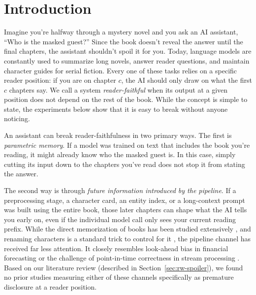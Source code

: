 \documentclass[sn-mathphys]{sn-jnl}%
\theoremstyle{thmstyleone}%
\theoremstyle{thmstyletwo}%
\theoremstyle{thmstylethree}%
\begin{document}
\maketitle

\section{Introduction}\label{sec:intro}

Imagine you're halfway through a mystery novel and you ask an AI assistant, ``Who is the masked guest?'' Since the book doesn't reveal the answer until the final chapters, the assistant shouldn't spoil it for you. Today, language models are constantly used to summarize long novels, answer reader questions, and maintain character guides for serial fiction. Every one of these tasks relies on a specific reader position: if you are on chapter $c$, the AI should only draw on what the first $c$ chapters say. We call a system \emph{reader-faithful} when its output at a given position does not depend on the rest of the book. While the concept is simple to state, the experiments below show that it is easy to break without anyone noticing.

An assistant can break reader-faithfulness in two primary ways. The first is \emph{parametric memory}. If a model was trained on text that includes the book you're reading, it might already know who the masked guest is. In this case, simply cutting its input down to the chapters you've read does not stop it from stating the answer.

The second way is through \emph{future information introduced by the pipeline}. If a preprocessing stage, a character card, an entity index, or a long-context prompt was built using the entire book, those later chapters can shape what the AI tells you early on, even if the individual model call only sees your current reading prefix. While the direct memorization of books has been studied extensively \cite{chang2023speak,fu2026summarization}, and renaming characters is a standard trick to control for it \cite{jiang2024beyond,deusser2026anonymization}, the pipeline channel has received far less attention. It closely resembles look-ahead bias in financial forecasting \cite{glasserman2023lookahead} or the challenge of point-in-time correctness in stream processing \cite{akidau2015dataflow}. Based on our literature review (described in Section~\ref{sec:rw-spoiler}), we found no prior studies measuring either of these channels specifically as premature disclosure at a reader position.
\end{document}
